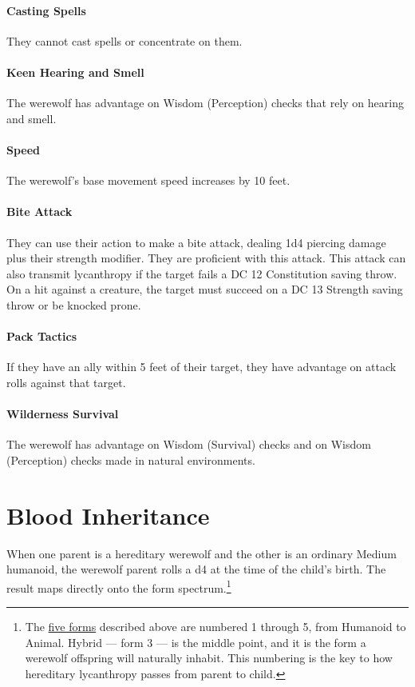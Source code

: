 \documentclass[twocolumn]{dndbook}
\begin{document}
\paragraph*{Casting Spells} They cannot cast spells or concentrate on them.
\paragraph*{Keen Hearing and Smell} The werewolf has advantage on Wisdom (Perception) checks that rely on hearing and smell.
\paragraph*{Speed} The werewolf's base movement speed increases by 10 feet.
\paragraph*{Bite Attack} They can use their action to make a bite attack, dealing 1d4 piercing damage plus their strength modifier. They are proficient with this attack. This attack can also transmit lycanthropy if the target fails a DC 12 Constitution saving throw. On a hit against a creature, the target must succeed on a DC 13 Strength saving throw or be knocked prone.
\paragraph*{Pack Tactics} If they have an ally within 5 feet of their target, they have advantage on attack rolls against that target.
\paragraph*{Wilderness Survival} The werewolf has advantage on Wisdom (Survival) checks and on Wisdom (Perception) checks made in natural environments.

\section*{Blood Inheritance}\label{sec:blood-inheritance}


When one parent is a hereditary werewolf and the other is an ordinary Medium humanoid, the werewolf parent rolls a d4 at the time of the child's birth.
The result maps directly onto the form spectrum.\footnote{The \hyperref[sec:the-forms]{five forms} described above are numbered 1 through 5, from Humanoid to Animal.
Hybrid --- form 3 --- is the middle point, and it is the form a werewolf offspring will naturally inhabit.
This numbering is the key to how hereditary lycanthropy passes from parent to child.}
\end{document}
